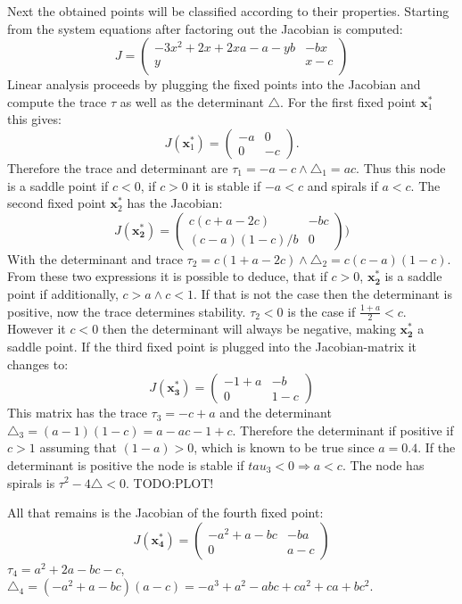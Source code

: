 Next the obtained points will be classified according to their properties. Starting from the system equations after factoring out the Jacobian is computed:
\begin{equation}
J = \begin{pmatrix}
-3x^2 + 2x + 2xa - a - yb & - bx \\
y & x-c \\
\end{pmatrix}
\end{equation}
Linear analysis proceeds by plugging the fixed points into the Jacobian and compute the trace $\tau$ as well as the determinant $\triangle$. For the first fixed point $\mathbf{x}_1^*$ this gives:
\begin{equation}
J(\mathbf{x}_1^*) = \begin{pmatrix}
-a & 0 \\
0  & -c \end{pmatrix}.
\end{equation}
Therefore the trace and determinant are $\tau_1 = -a-c \wedge \triangle_1 = ac$. Thus this node is a saddle point if $c < 0$, if $c > 0$ it is stable if $-a < c$ and spirals if $a < c$.
The second fixed point $\mathbf{x}_2^*$ has the Jacobian:
\begin{equation}
J(\mathbf{x_2^*}) = \begin{pmatrix}
c(c+a-2c) & - bc \\
(c-a)(1-c)/b &	0
\end{pmatrix})
\end{equation}
With the determinant and trace $\tau_2 = c(1+a-2c) \wedge \triangle_2 = c(c-a)(1-c)$. From these two expressions it is possible to deduce, that if $c>0$, $\mathbf{x_2^*}$ is a saddle point if additionally, $c > a \wedge c < 1$. If that is not the case then the determinant is positive, now the trace determines stability. $\tau_2 < 0$ is the case if $\frac{1+a}{2} < c$. However it $c < 0$ then the determinant will always be negative, making $\mathbf{x_2^*}$ a saddle point.
If the third fixed point is plugged into the Jacobian-matrix it changes to:
\begin{equation}
J(\mathbf{x_3^*}) = \begin{pmatrix}
-1 + a & -b \\
0 & 1-c 
\end{pmatrix}
\end{equation}
This matrix has the trace $\tau_3 = -c + a$ and the determinant $\triangle_3 = (a - 1)(1 - c) = a - ac -1 +c.$ Therefore the determinant if positive if $c > 1$ assuming that $(1-a) > 0$, which is known to be true since $a = 0.4$. If the determinant is positive the node is stable if $tau_3 < 0 \Rightarrow a < c.$ The node has spirals is $\tau^2 - 4\triangle < 0$. TODO:PLOT!

All that remains is the Jacobian of the fourth fixed point:
\begin{equation}
J(\mathbf{x_4^*}) = \begin{pmatrix}
-a ^2 + a - bc & -ba \\
0 & a-c 
\end{pmatrix} 
\end{equation}
$\tau_4 = a^2 + 2a -bc -c$, $\triangle_4 = (-a ^2 + a - bc)(a-c) = -a^3 + a^2 - abc + ca^2 + ca + bc^2$. 











